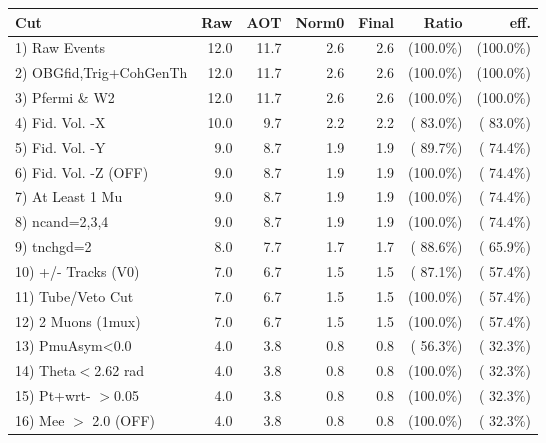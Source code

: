  \begin{table}[h!]\centering
 \begin{tabular}{||l||r|r|r|r|r|r||}
 \hline
 \hline
 Cut & Raw & AOT & Norm0 & Final & Ratio & eff.       \\
 \hline
  1) Raw Events           &         12.0 &         11.7 &          2.6 &          2.6 & (100.0\%) & (100.0\%) \\
  2) OBGfid,Trig+CohGenTh &         12.0 &         11.7 &          2.6 &          2.6 & (100.0\%) & (100.0\%) \\
  3) Pfermi \& W2         &         12.0 &         11.7 &          2.6 &          2.6 & (100.0\%) & (100.0\%) \\
  4) Fid. Vol. -X         &         10.0 &          9.7 &          2.2 &          2.2 & ( 83.0\%) & ( 83.0\%) \\
  5) Fid. Vol. -Y         &          9.0 &          8.7 &          1.9 &          1.9 & ( 89.7\%) & ( 74.4\%) \\
  6) Fid. Vol. -Z (OFF)   &          9.0 &          8.7 &          1.9 &          1.9 & (100.0\%) & ( 74.4\%) \\
  7) At Least 1 Mu        &          9.0 &          8.7 &          1.9 &          1.9 & (100.0\%) & ( 74.4\%) \\
  8) ncand=2,3,4          &          9.0 &          8.7 &          1.9 &          1.9 & (100.0\%) & ( 74.4\%) \\
  9) tnchgd=2             &          8.0 &          7.7 &          1.7 &          1.7 & ( 88.6\%) & ( 65.9\%) \\
 10) +/- Tracks (V0)      &          7.0 &          6.7 &          1.5 &          1.5 & ( 87.1\%) & ( 57.4\%) \\
 11) Tube/Veto Cut        &          7.0 &          6.7 &          1.5 &          1.5 & (100.0\%) & ( 57.4\%) \\
 12) 2 Muons (1mux)       &          7.0 &          6.7 &          1.5 &          1.5 & (100.0\%) & ( 57.4\%) \\
 13) PmuAsym<0.0          &          4.0 &          3.8 &          0.8 &          0.8 & ( 56.3\%) & ( 32.3\%) \\
 14) Theta$<$2.62 rad     &          4.0 &          3.8 &          0.8 &          0.8 & (100.0\%) & ( 32.3\%) \\
 15) Pt+wrt- $>$0.05      &          4.0 &          3.8 &          0.8 &          0.8 & (100.0\%) & ( 32.3\%) \\
 16) Mee $>$ 2.0  (OFF)   &          4.0 &          3.8 &          0.8 &          0.8 & (100.0\%) & ( 32.3\%) \\

\end{tabular}
\end{table}
